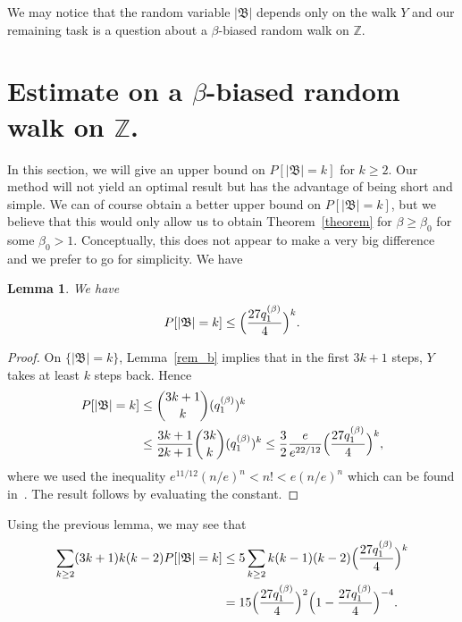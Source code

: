 \documentclass[12pt]{amsart}
\numberwithin{equation}{section}
\newtheorem{lemma}{Lemma}[section]
\begin{document}
  We may notice that the random variable ${\left\vert {\mathfrak{B}}\right\vert}$ depends only on the walk $Y$ and our remaining task is a question about a $\beta$-biased random walk on ${\mathbb{Z}}$.
 
 
 
 
 
 
 \section{Estimate on a $\beta$-biased random walk on ${\mathbb{Z}}$.}
 
 In this section, we will give an upper bound on $P[{\left\vert {\mathfrak{B}}\right\vert}=k]$ for $k\geq 2$. Our method will not yield an optimal result but has the advantage of being short and simple. We can of course obtain a better upper bound on $P[{\left\vert {\mathfrak{B}}\right\vert}=k]$, but we believe that this would only allow us to obtain Theorem~\ref{theorem} for $\beta\geq \beta_0$ for some $\beta_0>1$. Conceptually, this does not appear to make a very big difference and we prefer to go for simplicity. We have
 \begin{lemma}
 \label{tail_b}
 We have
 \[
 P[{\left\vert {\mathfrak{B}}\right\vert}=k] \leq \Bigl(\frac{27q_1^{(\beta)}}{4 }\Bigr)^k.
 \]
 \end{lemma}
 \begin{proof}
 On $\{{\left\vert {\mathfrak{B}}\right\vert}=k\}$, Lemma~\ref{rem_b} implies that in the first $3k+1$ steps, $Y$ takes at least $k$ steps back. Hence
 \begin{align*}
  P[{\left\vert {\mathfrak{B}}\right\vert}=k]  & \leq {3k+1 \choose k} (q_1^{(\beta)})^k \\
 &  \leq \frac{3k+1}{2k+1} {3k \choose k} (q_1^{(\beta)})^k 
  \leq \frac 32  \frac{e}{e^{22/12}} \Bigl(\frac{27 q_1^{(\beta)}}{4}\Bigr)^k,
  \end{align*}
  where we used the inequality $e^{11/12} (n/e)^n < n! <e (n/e)^n$ which can be found in~\cite{Hummel}. The result follows by evaluating the constant.
 \end{proof}

Using the previous lemma, we may see that
\begin{align*}
 \sum_{k\geq 2}(3k+1)k(k-2)P[{\left\vert {\mathfrak{B}}\right\vert}=k] & \leq 5 \sum_{k\geq 2} k(k-1)(k-2) \Bigl(\frac{27 q_1^{(\beta)}}{4}\Bigr)^k \\
 & =15 \Bigl(\frac{27 q_1^{(\beta)}}{4}\Bigr)^2 \Bigl(1-\frac{27 q_1^{(\beta)}}{4}\Bigr)^{-4}.
 \end{align*}
 
\end{document}
